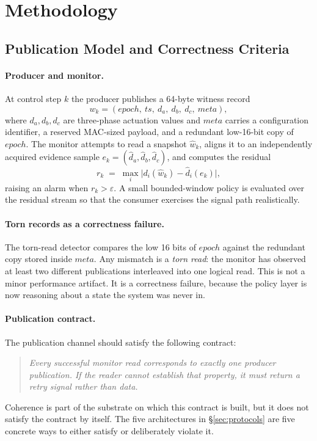 \section{Methodology}
\label{sec:method}

\subsection{Publication Model and Correctness Criteria}
\label{sec:model}

\paragraph{Producer and monitor.}
At control step $k$ the producer publishes a 64-byte witness record
\[
w_k = (\mathit{epoch},\ \mathit{ts},\ d_a,\ d_b,\ d_c,\ \mathit{meta}),
\]
where $d_a,d_b,d_c$ are three-phase actuation values and $\mathit{meta}$
carries a configuration identifier, a reserved MAC-sized payload, and a
redundant low-16-bit copy of $\mathit{epoch}$. The monitor attempts to
read a snapshot $\hat w_k$, aligns it to an independently acquired
evidence sample $e_k = (\hat d_a, \hat d_b, \hat d_c)$, and computes the
residual
\[
r_k \;=\; \max_i \bigl| d_i(\hat w_k) - \hat d_i(e_k) \bigr|,
\]
raising an alarm when $r_k>\varepsilon$. A small bounded-window \STL
policy is evaluated over the residual stream so that the consumer
exercises the signal path realistically.

\paragraph{Torn records as a correctness failure.}
The torn-read detector compares the low 16 bits of $\mathit{epoch}$
against the redundant copy stored inside $\mathit{meta}$. Any mismatch is
a \emph{torn read}: the monitor has observed at least two different
publications interleaved into one logical read. This is not a minor
performance artifact. It is a correctness failure, because the policy
layer is now reasoning about a state the system was never in.

\paragraph{Publication contract.}
The publication channel should satisfy the following contract:
\begin{quote}
\emph{Every successful monitor read corresponds to exactly one producer
publication. If the reader cannot establish that property, it must return
a retry signal rather than data.}
\end{quote}
Coherence is part of the substrate on which this contract is built, but
it does not satisfy the contract by itself. The five architectures in
\S\ref{sec:protocols} are five concrete ways to either satisfy or
deliberately violate it.

